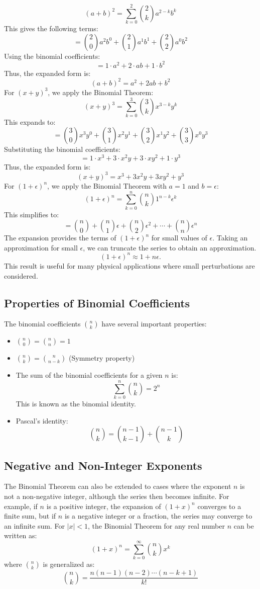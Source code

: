\[(a + b)^2 = \sum_{k=0}^{2} \binom{2}{k} a^{2-k} b^k\]
This gives the following terms:
\[= \binom{2}{0} a^2 b^0 + \binom{2}{1} a^1 b^1 + \binom{2}{2} a^0 b^2\]
Using the binomial coefficients:
\[= 1 \cdot a^2 + 2 \cdot ab + 1 \cdot b^2\]
Thus, the expanded form is:
\[(a + b)^2 = a^2 + 2ab + b^2\]
\noindent For \( (x + y)^3 \), we apply the Binomial Theorem:
\[(x + y)^3 = \sum_{k=0}^{3} \binom{3}{k} x^{3-k} y^k\]
This expands to:
\[= \binom{3}{0} x^3 y^0 + \binom{3}{1} x^2 y^1 + \binom{3}{2} x^1 y^2 + \binom{3}{3} x^0 y^3\]
Substituting the binomial coefficients:
\[= 1 \cdot x^3 + 3 \cdot x^2 y + 3 \cdot x y^2 + 1 \cdot y^3\]
Thus, the expanded form is:
\[(x + y)^3 = x^3 + 3x^2 y + 3x y^2 + y^3\]
\noindent For $(1+\epsilon)^n$, we apply the Binomial Theorem with $a = 1$ and $b = \epsilon$:
\[(1 + \epsilon)^n = \sum_{k=0}^{n} \binom{n}{k} 1^{n-k} \epsilon^k\]
This simplifies to:
\[= \binom{n}{0} + \binom{n}{1} \epsilon + \binom{n}{2} \epsilon^2 + \cdots + \binom{n}{n} \epsilon^n\]
The expansion provides the terms of $(1+\epsilon)^n$ for small values of $\epsilon$.
Taking an approximation for small $\epsilon$, we can truncate the series to obtain an approximation.
\[(1+\epsilon)^n \approx 1 + n\epsilon.\]
This result is useful for many physical applications where small perturbations are considered.
\subsection{Properties of Binomial Coefficients}
\noindent The binomial coefficients \( \binom{n}{k} \) have several important properties:
\begin{itemize}
    \item \( \binom{n}{0} = \binom{n}{n} = 1 \)
    \item \( \binom{n}{k} = \binom{n}{n-k} \) (Symmetry property)
    \item The sum of the binomial coefficients for a given \( n \) is:
    \[\sum_{k=0}^{n} \binom{n}{k} = 2^n\]
    This is known as the binomial identity.
    \item Pascal's identity:
    \[\binom{n}{k} = \binom{n-1}{k-1} + \binom{n-1}{k}\]
\end{itemize}
\subsection{Negative and Non-Integer Exponents}
\noindent The Binomial Theorem can also be extended to cases where the exponent \( n \) is not a non-negative integer, although the series then becomes infinite. 
For example, if \( n \) is a positive integer, the expansion of \( (1 + x)^n \) converges to a finite sum, but if \( n \) is a negative integer or a fraction, the series may converge to an infinite sum.
For \( |x| < 1 \), the Binomial Theorem for any real number \( n \) can be written as:
\[(1 + x)^n = \sum_{k=0}^{\infty} \binom{n}{k} x^k\]
where \( \binom{n}{k} \) is generalized as:
\[\binom{n}{k} = \frac{n(n-1)(n-2)\cdots (n-k+1)}{k!}\]
